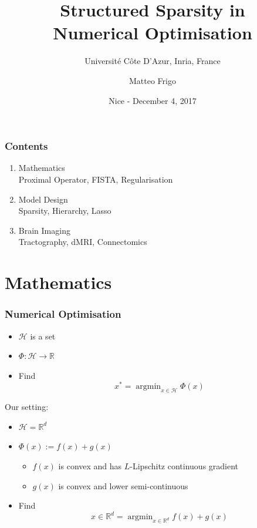 \documentclass{beamer}
\title{Structured Sparsity in\\Numerical Optimisation}
\subtitle{Universit\'{e} C\^ote D'Azur, Inria, France}
\author{Matteo Frigo}
\date{Nice - December 4, 2017}
\newcommand{\HH}{\mathcal{H}}
\newcommand{\RR}{\mathbb{R}}
\newcommand{\rd}{\mathbb{R}^d}
\DeclareMathOperator*{\argmin}{argmin}
\begin{document}
	\setcounter{showProgressBar}{0}
	\setcounter{showSlideNumbers}{0}

	\frame{\titlepage}

	\begin{frame}
		\frametitle{Contents}
		\begin{enumerate}
			\item Mathematics \\ \textcolor{ExecusharesGrey}{\footnotesize\hspace{1em} Proximal Operator, FISTA, Regularisation}
			\item Model Design  \\ \textcolor{ExecusharesGrey}{\footnotesize\hspace{1em} Sparsity, Hierarchy, Lasso}
			\item Brain Imaging \\ \textcolor{ExecusharesGrey}{\footnotesize\hspace{1em} Tractography, dMRI, Connectomics}
		\end{enumerate}
	\end{frame}

	\setcounter{framenumber}{0}
	\setcounter{showProgressBar}{1}
	\setcounter{showSlideNumbers}{1}
	\section{Mathematics}
	
		\begin{frame}
			\frametitle{Numerical Optimisation}
			\begin{itemize}
			\item $\HH$ is a set
			\item $\Phi: \HH\to\RR$
			\item Find \begin{equation}\nonumber x^* = \argmin_{x\in\HH}\Phi(x)\end{equation}
			\end{itemize}
			
			\pause
			\vfill
			
			Our setting:
			\begin{itemize}
			\item $\HH=\rd$
			\item $\Phi(x) := f(x) + g(x)$
				\begin{itemize}
				\item $f(x)$ is convex and has $L$-Lipschitz continuous gradient
				\item $g(x)$ is convex and lower semi-continuous
				\end{itemize}
			\item Find \begin{equation}\nonumber x\in\rd = \argmin_{x\in\rd}f(x)+g(x)\end{equation}
			\end{itemize}
			
		\end{frame}
\end{document}
